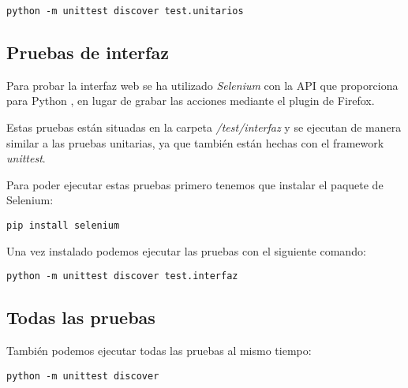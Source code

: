 \begin{lstlisting}
python -m unittest discover test.unitarios
\end{lstlisting}

\subsection{Pruebas de interfaz}

Para probar la interfaz web se ha utilizado \textit{Selenium} con la API que proporciona para Python \cite{misc:seleniumpython}, en lugar de grabar las acciones mediante el plugin de Firefox.

Estas pruebas están situadas en la carpeta \textit{/test/interfaz} y se ejecutan de manera similar a las pruebas unitarias, ya que también están hechas con el framework \textit{unittest}.

Para poder ejecutar estas pruebas primero tenemos que instalar el paquete de Selenium:

\begin{lstlisting}
pip install selenium
\end{lstlisting}

Una vez instalado podemos ejecutar las pruebas con el siguiente comando:

\begin{lstlisting}
python -m unittest discover test.interfaz
\end{lstlisting}

\subsection{Todas las pruebas}

También podemos ejecutar todas las pruebas al mismo tiempo:

\begin{lstlisting}
python -m unittest discover
\end{lstlisting}